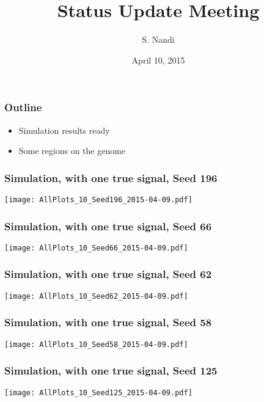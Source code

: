 \documentclass[10pt,dvipsnames,table]{beamer}
\title[Status Update Apr '15]{Status Update Meeting}
\author{S. Nandi}
\institute[LMCG]{LMCG \\
 University of Wisconsin-Madison}
\date{April 10, 2015}
\begin{document}
\setlength{\baselineskip}{16truept}
\frame{\maketitle}

\begin{frame}
\frametitle{Outline}
\begin{itemize}       
\item Simulation results ready 
\item Some regions on the genome
\end{itemize}
\end{frame}


\begin{frame}
\frametitle{Simulation, with one true signal, Seed 196}
\begin{center}
\texttt{[image: AllPlots\_10\_Seed196\_2015-04-09.pdf]}
\end{center}
\end{frame}

\begin{frame}
\frametitle{Simulation, with one true signal, Seed 66}
\begin{center}
\texttt{[image: AllPlots\_10\_Seed66\_2015-04-09.pdf]}
\end{center}
\end{frame}

\begin{frame}
\frametitle{Simulation, with one true signal, Seed 62}
\begin{center}
\texttt{[image: AllPlots\_10\_Seed62\_2015-04-09.pdf]}
\end{center}
\end{frame}

\begin{frame}
\frametitle{Simulation, with one true signal, Seed 58}
\begin{center}
\texttt{[image: AllPlots\_10\_Seed58\_2015-04-09.pdf]}
\end{center}
\end{frame}

\begin{frame}
\frametitle{Simulation, with one true signal, Seed 125}
\begin{center}
\texttt{[image: AllPlots\_10\_Seed125\_2015-04-09.pdf]}
\end{center}
\end{frame}
\end{document}
